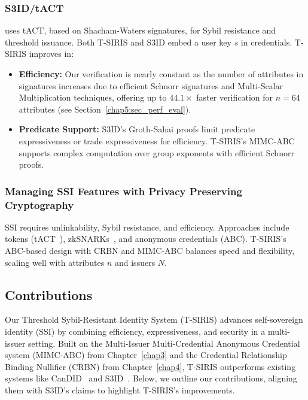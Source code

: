 \subsubsection*{S3ID/tACT} \cite{rabaninejad_attribute-based_2024} uses tACT, based on Shacham-Waters signatures, for Sybil resistance and threshold issuance. Both T-SIRIS and S3ID embed a user key $s$ in credentials. T-SIRIS improves in:
\begin{itemize}
    \item \textbf{Efficiency:} Our verification is nearly constant as the number of attributes in signatures increases due to efficient Schnorr signatures and Multi-Scalar Multiplication techniques, offering up to $44.1\times$ faster verification for $n=64$ attributes (see Section~\ref{chap5:sec_perf_eval}).
    \item \textbf{Predicate Support:} S3ID’s Groth-Sahai proofs limit predicate expressiveness or trade expressiveness for efficiency. T-SIRIS’s MIMC-ABC supports complex computation over group exponents with efficient Schnorr proofs.
\end{itemize}


\subsubsection*{Managing SSI Features with Privacy Preserving Cryptography}
SSI requires unlinkability, Sybil resistance, and efficiency. Approaches include tokens (tACT~\cite{rabaninejad_attribute-based_2024}), zkSNARKs~\cite{rosenberg_zk-creds_2022}, and anonymous credentials (ABC). T-SIRIS’s ABC-based design with CRBN and MIMC-ABC balances speed and flexibility, scaling well with attributes $n$ and issuers $N$.


\subsection{Contributions}
\label{sec:tsiris_contributions}

Our Threshold Sybil-Resistant Identity System (T-SIRIS) advances self-sovereign identity (SSI) by combining efficiency, expressiveness, and security in a multi-issuer setting. Built on the Multi-Issuer Multi-Credential Anonymous Credential system (MIMC-ABC) from Chapter~\ref{chap3} and the Credential Relationship Binding Nullifier (CRBN) from Chapter~\ref{chap4}, T-SIRIS outperforms existing systems like CanDID~\cite{maram_candid_2020} and S3ID~\cite{rabaninejad_attribute-based_2024}. Below, we outline our contributions, aligning them with S3ID’s claims to highlight T-SIRIS’s improvements.

